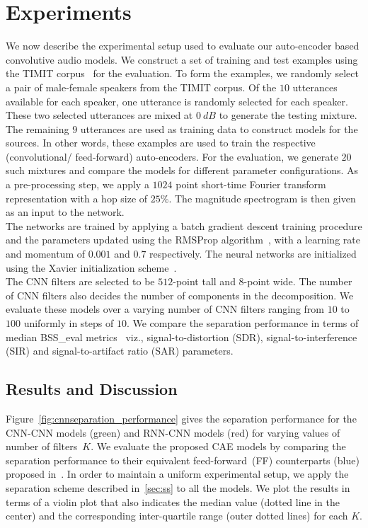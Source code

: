 \documentclass{article}
\begin{document}
\section{Experiments}
\label{sec:experiments}
We now describe the experimental setup used to evaluate our auto-encoder based convolutive audio models. We construct a set of training and test examples using the TIMIT corpus~\cite{timit} for the evaluation. To form the examples, we randomly select a pair of male-female speakers from the TIMIT corpus. Of the $10$ utterances available for each speaker, one utterance is randomly selected for each speaker. These two selected utterances are mixed at $0~dB$ to generate the testing mixture. The remaining $9$ utterances are used as training data to construct models for the sources. In other words, these examples are used to train the respective (convolutional/ feed-forward) auto-encoders. For the evaluation, we generate $20$ such mixtures and compare the models for different parameter configurations. As a pre-processing step, we apply a $1024$ point short-time Fourier transform representation with a hop size of $25\%$. The magnitude spectrogram is then given as an input to the network. \\

The networks are trained by applying a batch gradient descent training procedure and the parameters updated using the RMSProp algorithm~\cite{tieleman2012rmsprop}, with a learning rate and momentum of $0.001$ and $0.7$ respectively. The neural networks are initialized using the Xavier initialization scheme~\cite{glorot2010understanding}.\\

The CNN filters are selected to be $512$-point tall and $8$-point wide. The number of CNN filters also decides the number of components in the decomposition. We evaluate these models over a varying number of CNN filters ranging from $10$ to $100$ uniformly in steps of $10$. We compare the separation performance in terms of median BSS\_eval metrics~\cite{fevotte2005bss_eval} viz., signal-to-distortion (SDR), signal-to-interference (SIR) and signal-to-artifact ratio (SAR) parameters. \\

\subsection{Results and Discussion}
\label{subsec:results}
Figure~\ref{fig:cnnseparation_performance} gives the separation performance for the CNN-CNN models (green) and RNN-CNN models (red) for varying values of number of filters~$K$. We evaluate the proposed CAE models by comparing the separation performance to their equivalent feed-forward~(FF) counterparts (blue) proposed in~\cite{smaragdis2017aneural}. In order to maintain a uniform experimental setup, we apply the separation scheme described in~\ref{sec:ss} to all the models. We plot the results in terms of a violin plot that also indicates the median value (dotted line in the center) and the corresponding inter-quartile range (outer dotted lines) for each $K$. \\
\end{document}
